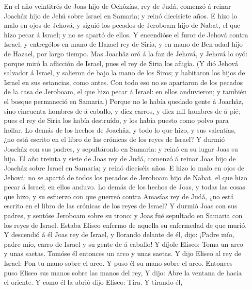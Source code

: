  En el año veintitrés de Joas hijo de Ochôzías, rey de
Judá, comenzó á reinar Joachâz hijo de Jehú sobre Israel en Samaria; y
reinó diecisiete años.  E hizo lo malo en ojos de Jehová,
y siguió los pecados de Jeroboam hijo de Nabat, el que hizo pecar á
Israel; y no se apartó de ellos.  Y encendióse el furor de
Jehová contra Israel, y entrególos en mano de Hazael rey de Siria, y en
mano de Ben-adad hijo de Hazael, por largo tiempo.  Mas
Joachâz oró á la faz de Jehová, y Jehová lo oyó: porque miró la
aflicción de Israel, pues el rey de Siria los afligía.  (Y
dió Jehová salvador á Israel, y salieron de bajo la mano de los Siros; y
habitaron los hijos de Israel en sus estancias, como antes.
 Con todo eso no se apartaron de los pecados de la casa de
Jeroboam, el que hizo pecar á Israel: en ellos anduvieron; y también el
bosque permaneció en Samaria.)  Porque no le había quedado
gente á Joachâz, sino cincuenta hombres de á caballo, y diez carros, y
diez mil hombres de á pié; pues el rey de Siria los había destruído, y
los había puesto como polvo para hollar.  Lo demás de los
hechos de Joachâz, y todo lo que hizo, y sus valentías, ¿no está escrito
en el libro de las crónicas de los reyes de Israel?  Y
durmió Joachâz con sus padres, y sepultáronlo en Samaria: y reinó en su
lugar Joas su hijo.  El año treinta y siete de Joas rey
de Judá, comenzó á reinar Joas hijo de Joachâz sobre Israel en Samaria;
y reinó dieciséis años.  E hizo lo malo en ojos de
Jehová: no se apartó de todos los pecados de Jeroboam hijo de Nabat, el
que hizo pecar á Israel; en ellos anduvo.  Lo demás de
los hechos de Joas, y todas las cosas que hizo, y su esfuerzo con que
guerreó contra Amasías rey de Judá, ¿no está escrito en el libro de las
crónicas de los reyes de Israel?  Y durmió Joas con sus
padres, y sentóse Jeroboam sobre su trono: y Joas fué sepultado en
Samaria con los reyes de Israel.  Estaba Eliseo enfermo
de aquella su enfermedad de que murió. Y descendió á él Joas rey de
Israel, y llorando delante de él, dijo: ¡Padre mío, padre mío, carro de
Israel y su gente de á caballo!  Y díjole Eliseo: Toma un
arco y unas saetas. Tomóse él entonces un arco y unas saetas.
 Y dijo Eliseo al rey de Israel: Pon tu mano sobre el
arco. Y puso él su mano sobre el arco. Entonces puso Eliseo sus manos
sobre las manos del rey,  Y dijo: Abre la ventana de
hacia el oriente. Y como él la abrió dijo Eliseo: Tira. Y tirando él,
